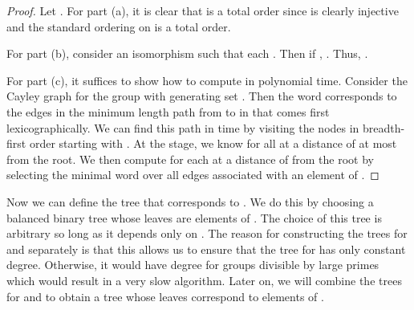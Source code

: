 
\begin{proof}
  Let .  For part (a), it is clear that  is a total order since  is clearly injective and the standard ordering on  is a total order.

  For part (b), consider an isomorphism  such that each .  Then if , .  Thus,  \ifft  \ifft  \ifft .

  For part (c), it suffices to show how to compute  in polynomial time.  Consider the Cayley graph  for the group  with generating set .  Then the word  corresponds to the edges in the minimum length path from  to  in  that comes first lexicographically.  We can find this path in  time by visiting the nodes in breadth-first order starting with .  At the  stage, we know  for all  at a distance of at most  from the root.  We then compute  for each  at a distance of  from the root by selecting the minimal word  over all edges  associated with an element  of .
\end{proof}

Now we can define the tree that corresponds to .  We do this by choosing a balanced binary tree whose leaves are elements of .  The choice of this tree is arbitrary so long as it depends only on .  The reason for constructing the trees for  and  separately is that this allows us to ensure that the tree for  has only constant degree.  Otherwise, it would have degree  for groups divisible by large primes which would result in a very slow algorithm.  Later on, we will combine the trees for  and  to obtain a tree whose leaves correspond to elements of .

